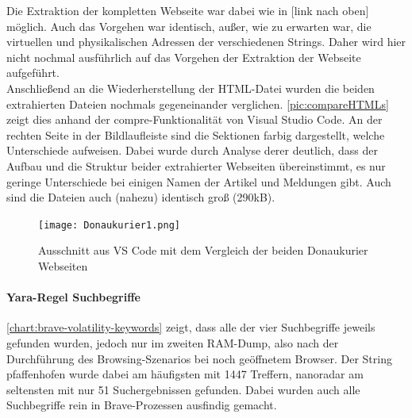 Die Extraktion der kompletten Webseite war dabei wie in [link nach oben] möglich. Auch das Vorgehen war identisch, außer, wie zu erwarten war, die virtuellen und physikalischen Adressen der verschiedenen Strings. Daher wird hier nicht nochmal ausführlich auf das Vorgehen der Extraktion der Webseite aufgeführt.\\
Anschließend an die Wiederherstellung der HTML-Datei wurden die beiden extrahierten Dateien nochmals gegeneinander verglichen. \autoref{pic:compareHTMLs} zeigt dies anhand der compre-Funktionalität von Visual Studio Code. An der rechten Seite in der Bildlaufleiste sind die Sektionen farbig dargestellt, welche Unterschiede aufweisen. Dabei wurde durch Analyse derer deutlich, dass der Aufbau und die Struktur beider extrahierter Webseiten übereinstimmt, es nur geringe Unterschiede bei einigen Namen der Artikel und Meldungen gibt. Auch sind die Dateien auch (nahezu) identisch groß (290kB).

\begin{figure}[h!]
	\centering
	\texttt{[image: Donaukurier1.png]}
	\caption{Ausschnitt aus VS Code mit dem Vergleich der beiden Donaukurier Webseiten}
	\label{pic:compareHTMLs}
\end{figure}

\paragraph*{Yara-Regel \glqq{}Suchbegriffe\grqq{}}\label{chap:ergebnisse-brave-uncommon-locations-volatility-suchbegriffe}  

\autoref{chart:brave-volatility-keywords} zeigt, dass alle der vier Suchbegriffe jeweils gefunden wurden, jedoch nur im zweiten RAM-Dump, also nach der Durchführung des Browsing-Szenarios bei noch geöffnetem Browser. Der String \glqq{}pfaffenhofen\grqq{} wurde dabei am häufigsten mit 1447 Treffern, \glqq{}nanoradar\grqq{} am seltensten mit nur 51 Suchergebnissen gefunden. Dabei wurden auch alle Suchbegriffe rein in Brave-Prozessen ausfindig gemacht.


